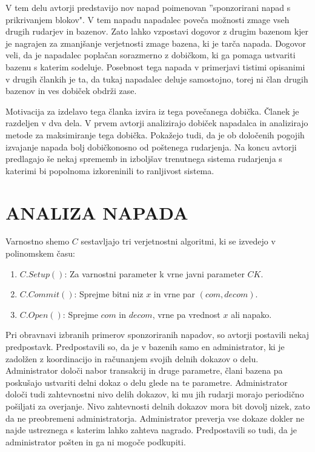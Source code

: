 \documentclass{acm_proc_article-sp}
\begin{document}
V tem delu avtorji predstavijo nov napad poimenovan ''sponzorirani napad s prikrivanjem blokov". V tem napadu napadalec poveča možnosti zmage vseh drugih rudarjev in bazenov. Zato lahko vzpostavi dogovor z drugim bazenom kjer je nagrajen za zmanjšanje verjetnosti zmage bazena, ki je tarča napada. Dogovor veli, da je napadalec poplačan sorazmerno z dobičkom, ki ga pomaga ustvariti bazenu s katerim sodeluje. Posebnost tega napada v primerjavi tistimi opisanimi v drugih člankih je ta, da tukaj napadalec deluje samostojno, torej ni član drugih bazenov in ves dobiček obdrži zase.

Motivacija za izdelavo tega članka izvira iz tega povečanega dobička. Članek je razdeljen v dva dela. V prvem avtorji analizirajo dobiček napadalca in analizirajo metode za maksimiranje tega dobička. Pokažejo tudi, da je ob določenih pogojih izvajanje napada bolj dobičkonosno od poštenega rudarjenja. Na koncu avtorji predlagajo še nekaj sprememb in izboljšav trenutnega sistema rudarjenja s katerimi bi popolnoma izkoreninili to ranljivost sistema.

\vfill\eject

\section{ANALIZA NAPADA}

\newline
\indent Varnostno shemo $C$ sestavljajo tri verjetnostni algoritmi, ki se izvedejo v polinomskem času:
\begin{enumerate}
\item $C.Setup()$: Za varnostni parameter k vrne javni parameter $CK$.
\item $C.Commit()$: Sprejme bitni niz $x$ in vrne par $(com, decom)$.
\item $C.Open()$: Sprejme $com$ in $decom$, vrne pa vrednost $x$ ali napako.
\end{enumerate}

Pri obravnavi izbranih primerov sponzoriranih napadov, so avtorji postavili nekaj predpostavk. Predpostavili so, da je v bazenih samo en administrator, ki je zadolžen z koordinacijo in računanjem svojih delnih dokazov o delu. Administrator določi nabor transakcij in druge parametre, člani bazena pa poskušajo ustvariti  delni dokaz o delu glede na te parametre. Administrator določi tudi zahtevnostni nivo delih dokazov, ki mu jih rudarji morajo periodično pošiljati za overjanje. Nivo zahtevnosti delnih dokazov mora bit dovolj nizek, zato da ne preobremeni administratorja. Administrator preverja vse dokaze dokler ne najde ustreznega s katerim lahko zahteva nagrado. Predpostavili so tudi, da je administrator pošten in ga ni mogoče podkupiti.
\end{document}
